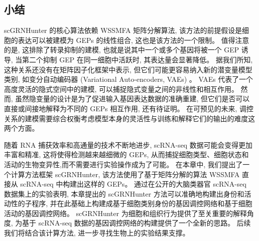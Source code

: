 \subsection{小结}
scGRNHunter 的核心算法依赖 WSSMFA 矩阵分解算法,
该方法的前提假设是细胞的表达可以被建模为 GEPs 的线性组合,
这也是该方法的一个限制。
值得注意的是, 这排除了转录抑制的建模, 也就是说其中一个或多个基因将被一个 GEP 诱导,
当第二个抑制 GEP 在同一细胞中活跃时, 其表达量会显著降低。
据我们所知, 这种关系还没有在矩阵因子化框架中表示, 但它们可能更容易纳入新的潜变量模型类别,
如变分自动编码器 (Variational Auto-encoders, VAEs) 。
VAEs 代表了一个高度灵活的隐式空间中的建模, 可以捕捉隐式变量之间的非线性和相互作用。
然而, 虽然隐变量的设计是为了促进输入基因表达数据的准确重建, 
但它们是否可以直接或间接地解释为不同的 GEPs 相互作用, 还有待证明。
在可预见的未来, 调控关系的建模需要综合权衡考虑模型本身的灵活性与训练和解释它们的输出的难度这两个方面。

随着 RNA 捕获效率和高通量的技术不断地进步, scRNA-seq 数据可能会变得更加丰富和精准,
这将使得检测越来越细微的 GEPs, 从而捕捉细胞类型、细胞状态和活动的生物变异性,而不需要进行实验操作成为了可能。
在本章中, 我们提出了一个计算方法框架 scGRNHunter,
该方法使用了基于矩阵分解的算法 WSSMFA 直接从 scRNA-seq 中构建出这样的 GEPs。 
通过在公开的大脑类器官 scRNA-seq 数据集上的实验表明,
本章提出的 scGRNHunter 方法可以准确地构建出身份和活动性的子程序, 
并在此基础上构建成基于细胞类别身份的基因调控网络和基于细胞活动的基因调控网络。
scGRNHunter 为细胞和组织行为提供了至关重要的解释角度,
为基于 scRNA-seq 数据的基因调控网络的构建提供了一个全新的思路。
后续我们将结合该计算方法, 进一步寻找生物上的实验结果支撑。